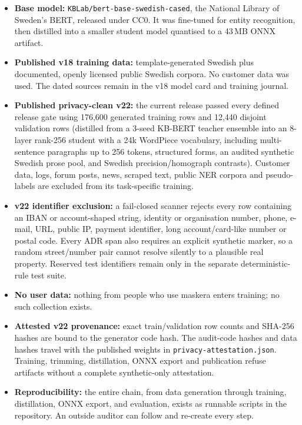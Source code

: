 \documentclass[10pt,a4paper]{article}
\newcommand{\pkg}[1]{\texttt{#1}}
\begin{document}
\begin{itemize}
  \item \textbf{Base model:} \pkg{KBLab/bert-base-}\allowbreak\pkg{swedish-cased},
        the National Library of Sweden's BERT, released under CC0. It was
        fine-tuned for entity recognition, then distilled into a smaller
        student model quantised to a 43\,MB ONNX artifact.
  \item \textbf{Published v18 training data:} template-generated Swedish plus
        documented, openly licensed public Swedish corpora. No customer data
        was used. The dated sources remain in the v18 model card and training
        journal.
  \item \textbf{Published privacy-clean v22:} the current release passed
        every defined release gate using 176,600 generated training rows
        and 12,440 disjoint validation rows (distilled from a 3-seed KB-BERT
        teacher ensemble into an 8-layer rank-256 student with a 24k WordPiece
        vocabulary, including multi-sentence paragraphs up to 256 tokens,
        structured forms, an audited synthetic Swedish prose pool, and Swedish
        precision/homograph contrasts). Customer data, logs,
        forum posts, news, scraped text, public NER corpora and pseudo-labels
        are excluded from its task-specific training.
  \item \textbf{v22 identifier exclusion:} a fail-closed scanner rejects every
        row containing an IBAN or account-shaped string, identity or
        organisation number, phone, e-mail, URL, public IP, payment
        identifier, long account/card-like number or postal code. Every ADR
        span also requires an explicit synthetic marker, so a random
        street/number pair cannot resolve silently to a plausible real
        property. Reserved test identifiers remain only in the separate
        deterministic-rule test suite.
  \item \textbf{No user data:} nothing from people who use maskera enters
        training; no such collection exists.
  \item \textbf{Attested v22 provenance:} exact train/validation row counts and
        SHA-256 hashes are bound to the generator code hash. The audit-code
        hashes and data hashes travel with the published weights in
        \pkg{privacy-attestation.json}. Training, trimming, distillation,
        ONNX export and publication refuse artifacts without a complete
        synthetic-only attestation.
  \item \textbf{Reproducibility:} the entire chain, from data generation
        through training, distillation, ONNX export, and evaluation, exists
        as runnable scripts in the repository. An outside auditor can follow
        and re-create every step.
\end{itemize}
\end{document}
